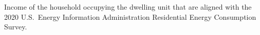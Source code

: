 Income of the household occupying the dwelling unit that are aligned with the 2020 U.S.~Energy Information Administration Residential Energy Consumption Survey.
